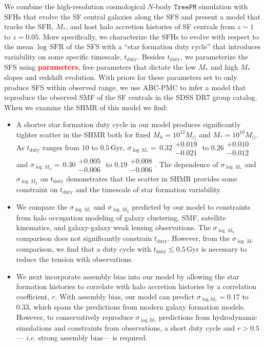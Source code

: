 \documentclass[12pt, letterpaper, preprint, tighten]{aastex62}
\newcommand{\todo}[1]{{\bf \textcolor{red}{#1}}}
\newcommand{\bitem}{\begin{itemize}}
\newcommand{\eitem}{\end{itemize}}
\begin{document}
We combine the high-resolution cosmological $N$-body $\mathtt{TreePM}$ simulation 
with SFHs that evolve the SF central galaxies along the SFS and present a model 
that tracks the SFR, $M_*$, and host halo accretion histories of SF centrals from $z \sim 1$
to $z=0.05$. More specifically, we characterize the SFHs to evolve with respect to 
the mean $\log\,\mathrm{SFR}$ of the SFS with a ``star formation duty cycle'' that 
introduces variability on some specific timescale, $t_\mathrm{duty}$. Besides $t_\mathrm{duty}$,
we parameterize the SFS using \todo{parameters}, free parameters that dictate the 
low $M_*$ and high $M_*$ slopes and redshift evolution. With priors for these 
parameters set to only produce SFS within observed range, we use ABC-PMC to infer 
a model that reproduce the observed SMF of the SF centrals in the SDSS DR7 group 
catalog. When we examine the SHMR of this model we find: 
\bitem
\item A shorter star formation duty cycle in our model produces significantly 
tighter scatter in the SHMR both for fixed $M_h = 10^{12} M_\odot$ and 
$M_* = 10^{10}M_\odot$. As $t_\mathrm{duty}$ ranges from $10$ to $0.5\,\mathrm{Gyr}$, 
$\sigma_{\log\,M_*}{=}\,0.32\substack{+0.019\\ -0.021}$ to $0.26\substack{+0.010\\-0.012}$ 
and $\sigma_{\log\,M_h}{=}\,0.30\substack{+0.005\\ -0.006}$ to $0.19\substack{+0.008\\-0.006}$. 
The dependence of $\sigma_{\log\,M_*}$ and $\sigma_{\log\,M_h}$ on $t_\mathrm{duty}$ 
demonstrates that the scatter in SHMR provides some constraint on $t_\mathrm{duty}$ and
the timescale of star formation variability. 

\item We compare the $\sigma_{\log\,M_*}$ and $\sigma_{\log\,M_h}$ predicted by our 
model to constraints from halo occupation modeling of galaxy clustering, SMF, 
satellite kinematics, and galaxy-galaxy weak lensing observations. The $\sigma_{\log\,M_h}$
comparison does not significantly constrain $t_\mathrm{duty}$. However, from the 
$\sigma_{\log\,M_*}$ comparison, we find that a duty cycle with 
$t_\mathrm{duty} \lesssim 0.5\,\mathrm{Gyr}$ is necessary to reduce the tension 
with observations.

\item %
We next incorporate 
assembly bias into our model by allowing the star formation histories to 
correlate with halo accretion histories by a correlation coefficient, $r$. 
With assembly bias, our model can predict $\sigma_{\log M_*}{=}0.17$ to $0.33$, 
which spans the predictions from modern galaxy formation models. %
However, to conservatively reproduce $\sigma_{\log M_*}$ predictions from 
hydrodynamic simulations and constraints from observations, a short duty 
cycle and $r > 0.5$--- \emph{i.e.} strong assembly bias--- is required. 
\eitem 
\end{document}
